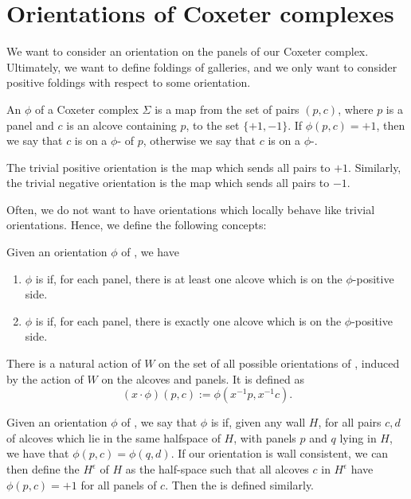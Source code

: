 \documentclass[11pt]{article}
\begin{document}
\section{Orientations of Coxeter complexes}\label{6}

We want to consider an orientation on the panels of our Coxeter complex. Ultimately, we want to define foldings of galleries, and we only want to consider positive foldings with respect to some orientation.


\begin{definition}
    An  $\phi$ of a Coxeter complex $\Sigma$ is a map from the set of pairs $(p,c)$, where $p$ is a panel and $c$ is an alcove containing $p$, to the set $\{+1,-1\}$. If $\phi (p,c)=+1$, then we say that $c$ is on a $\phi$- of $p$, otherwise we say that $c$ is on a $\phi$-. 
\end{definition}


\begin{example}
    The trivial positive orientation is the map which sends all pairs to $+1$. Similarly, the trivial negative orientation is the map which sends all pairs to $-1$. 
\end{example}

Often, we do not want to have orientations which locally behave like trivial orientations. Hence, we define the following concepts:

\begin{definition}
    Given an orientation $\phi$ of \sg, we have
    \begin{enumerate}
        \item $\phi$ is  if, for each panel, there is at least one alcove which is on the $\phi$-positive side.
        \item $\phi$ is  if, for each panel, there is exactly one alcove which is on the $\phi$-positive side.
    \end{enumerate}
\end{definition}


There is a natural action of $W$ on the set of all possible orientations of \sg, induced by the action of $W$ on the alcoves and panels. It is defined as 
\[(x\cdot\phi)(p,c):=\phi(x^{-1}p,x^{-1}c).\]

\begin{definition}
    Given an orientation $\phi$ of \sg, we say that $\phi$ is  if, given any wall $H$, for all pairs $c,d$ of alcoves which lie in the same halfspace of $H$, with panels $p$ and $q$ lying in $H$, we have that $\phi(p,c)=\phi(q,d)$. If our orientation is wall consistent, we can then define the  $H^{\epsilon}$ of $H$ as the half-space such that all alcoves $c$ in $H^{\epsilon}$ have $\phi(p,c)=+1$ for all panels of $c$. Then the  is defined similarly.
\end{definition}
\end{document}
